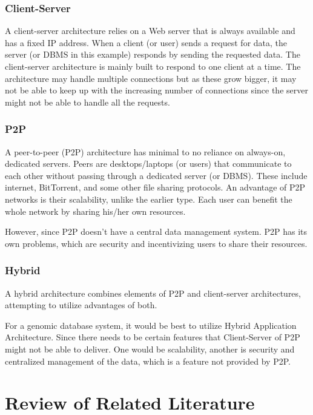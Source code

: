 \documentclass[acmsmall]{acmart}
\begin{document}
\subsubsection{Client-Server}
A client-server architecture relies on a Web server that is always available and has a fixed IP address. When a client (or user) sends a request for data, the server (or DBMS in this example) responds by sending the requested data. The client-server architecture is mainly built to respond to one client at a time. The architecture may handle multiple connections but as these grow bigger, it may not be able to keep up with the increasing number of connections since the server might not be able to handle all the requests.

\subsubsection{P2P}
A peer-to-peer (P2P) architecture has minimal to no reliance on always-on, dedicated servers. Peers are desktops/laptops (or users) that communicate to each other without passing through a dedicated server (or DBMS). These include internet, BitTorrent, and some other file sharing protocols. An advantage of P2P networks is their scalability, unlike the earlier type. Each user can benefit the whole network by sharing his/her own resources. 

However, since P2P doesn't have a central data management system. P2P has its own problems, which are security and incentivizing users to share their resources.

\subsubsection{Hybrid}
A hybrid architecture combines elements of P2P and client-server architectures, attempting to utilize advantages of both.

For a genomic database system, it would be best to utilize Hybrid Application Architecture. Since there needs to be certain features that Client-Server of P2P might not be able to deliver. One would be scalability, another is security and centralized management of the data, which is a feature not provided by P2P.


\section{Review of Related Literature}
\end{document}
